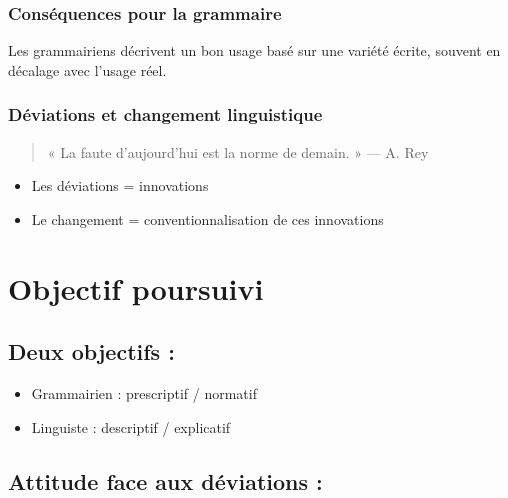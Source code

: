 \documentclass[
  letterpaper,
]{scrbook}
\begin{document}
\hypertarget{consuxe9quences-pour-la-grammaire}{%
\subsubsection{Conséquences pour la
grammaire}\label{consuxe9quences-pour-la-grammaire}}

Les grammairiens décrivent un bon usage basé sur une variété écrite,
souvent en décalage avec l'usage réel.

\hypertarget{duxe9viations-et-changement-linguistique}{%
\subsubsection{Déviations et changement
linguistique}\label{duxe9viations-et-changement-linguistique}}

\begin{quote}
« La faute d'aujourd'hui est la norme de demain. » --- A. Rey
\end{quote}

\begin{itemize}
\item
  Les déviations = innovations
\item
  Le changement = conventionnalisation de ces innovations
\end{itemize}

\hypertarget{objectif-poursuivi}{%
\section{Objectif poursuivi}\label{objectif-poursuivi}}

\hypertarget{deux-objectifs}{%
\subsection{Deux objectifs :}\label{deux-objectifs}}

\begin{itemize}
\item
  Grammairien : prescriptif / normatif
\item
  Linguiste : descriptif / explicatif
\end{itemize}

\hypertarget{attitude-face-aux-duxe9viations}{%
\subsection{Attitude face aux déviations
:}\label{attitude-face-aux-duxe9viations}}
\end{document}
